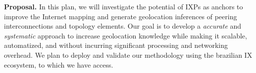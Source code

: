 

	\textbf{Proposal.} In this plan, we will investigate the potential of IXPs as anchors to improve the Internet mapping and generate geolocation inferences of peering interconnections and topology elements. Our goal is to develop a \emph{accurate} and \emph{systematic} approach to increase geolocation knowledge while making it scalable, automatized, and without incurring significant processing and networking overhead. We plan to deploy and validate our methodology using the brazilian IX ecosystem, to which we have access.



